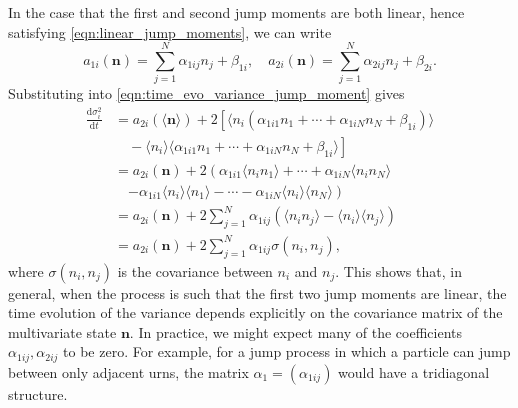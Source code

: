 \documentclass[a4paper,11pt]{article}
\numberwithin{equation}{section}
\newcommand{\diff}[2]{\frac{\mathrm{d} #1}{\mathrm{d} #2}}
\newcommand{\V}[1]{\mathbf{#1}}
\newcommand{\E}[1]{\langle #1 \rangle}
\begin{document}
In the case that the first and second jump moments are both linear, hence
satisfying \eqref{eqn:linear_jump_moments}, we can write
\begin{equation*}
    a_{1i}(\V{n}) = \sum_{j=1}^N \alpha_{1ij} n_j + \beta_{1i}, \quad
    a_{2i}(\V{n}) = \sum_{j=1}^N \alpha_{2ij} n_j + \beta_{2i}.
\end{equation*}
Substituting into \eqref{eqn:time_evo_variance_jump_moment} gives
\begin{equation}
    \begin{aligned}
        \diff{\sigma_i^2}{t} &= a_{2i}(\E{\V{n}}) + 2\left[ \E{n_i (\alpha_{1i1}n_1 +
            \dotsb + \alpha_{1iN}n_N + \beta_{1i})} \right.\\
            &\left. \quad - \E{n_i} \E{ \alpha_{1i1}n_1 +
        \dotsb + \alpha_{1iN}n_N + \beta_{1i}} \right]\\
        &= a_{2i}(\V{n}) + 2\left( \alpha_{1i1}\E{n_i n_1} + \dotsb +
        \alpha_{1iN}\E{n_i n_N}\right.\\
        &\quad \left. - \alpha_{1i1}\E{n_i}\E{n_1} - \dotsb -
        \alpha_{1iN}\E{n_i}\E{n_N} \right)\\
        &= a_{2i}(\V{n}) + 2 \sum_{j=1}^N \alpha_{1ij}(\E{n_i n_j} -
        \E{n_i}\E{n_j})\\
        &= a_{2i}(\V{n}) + 2 \sum_{j=1}^N \alpha_{1ij}\sigma(n_i,n_j),
    \end{aligned}
\end{equation}
where \(\sigma(n_i, n_j)\) is the covariance between \(n_i\) and \(n_j\).
This shows that, in general, when the process is such that the first two jump
moments are linear, the time evolution of the variance depends explicitly on the
covariance matrix of the multivariate state \(\V{n}\). In practice, we might
expect many of the coefficients \(\alpha_{1ij}, \alpha_{2ij}\) to be zero. For
example, for a jump process in which a particle can jump between only adjacent
urns, the matrix \(\alpha_1 = (\alpha_{1ij})\) would have a tridiagonal
structure.
\end{document}
